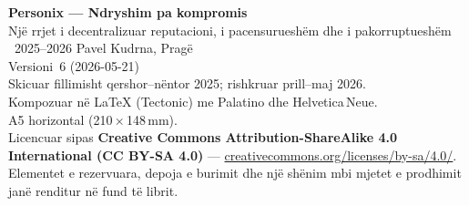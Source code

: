 \thispagestyle{empty}
\ifdefined\printmode\vspace*{\fill}\else{}\fi
\begin{flushleft}\small\sffamily
\textbf{Personix --- Ndryshim pa kompromis}\\[0.3em]
Një rrjet i decentralizuar reputacioni, i pacensurueshëm dhe i pakorruptueshëm\\[1.4em]

\textcopyright\ 2025--2026 Pavel Kudrna, Pragë\\[0.4em]

Versioni~6 (2026-05-21)\\
Skicuar fillimisht qershor--nëntor 2025; rishkruar prill--maj 2026.\\[1.4em]

Kompozuar në \LaTeX{} (Tectonic) me Palatino dhe Helvetica\,Neue.\\
A5 horizontal (210\,$\times$\,148\,mm).\\[1.4em]

Licencuar sipas \textbf{Creative Commons Attribution-ShareAlike 4.0
International (CC BY-SA 4.0)} ---
\href{https://creativecommons.org/licenses/by-sa/4.0/}{creativecommons.org/licenses/by-sa/4.0/}.
Elementet e rezervuara, depoja e burimit dhe një shënim mbi mjetet e prodhimit
janë renditur në fund të librit.
\end{flushleft}
\ifdefined\printmode\else{}\fi
\clearpage
